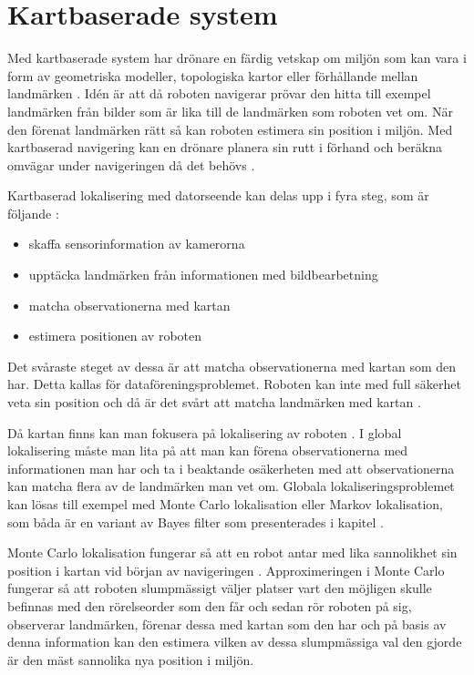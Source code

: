 \section{Kartbaserade system}

Med kartbaserade system har drönare en färdig vetskap om miljön som kan vara i form av geometriska modeller, topologiska kartor eller förhållande mellan landmärken \citep{982903}. Idén är att då roboten navigerar prövar den hitta till exempel landmärken från bilder som är lika till de landmärken som roboten vet om. När den förenat landmärken rätt så kan roboten estimera sin position i miljön. Med kartbaserad navigering kan en drönare planera sin rutt i förhand och beräkna omvägar under navigeringen då det behövs \citep{geospatial}. 

Kartbaserad lokalisering med datorseende kan delas upp i fyra steg, som är följande \citep{982903}:

\begin{itemize}
    \item skaffa sensorinformation av kamerorna
    \item upptäcka landmärken från informationen med bildbearbetning
    \item matcha observationerna med kartan
    \item estimera positionen av roboten
\end{itemize}

Det svåraste steget av dessa är att matcha observationerna med kartan som den har. Detta kallas för dataföreningsproblemet. Roboten kan inte med full säkerhet veta sin position och då är det svårt att matcha landmärken med kartan \citep{982903}.

Då kartan finns kan man fokusera på lokalisering av roboten \citep{982903}. I global lokalisering måste man lita på att man kan förena observationerna med informationen man har och ta i beaktande osäkerheten med att observationerna kan matcha flera av de landmärken man vet om. Globala lokaliseringsproblemet kan lösas till exempel med Monte Carlo lokalisation eller Markov lokalisation, som båda är en variant av Bayes filter som presenterades i kapitel  \citep{ProbabilisticRobotics}. 

Monte Carlo lokalisation fungerar så att en robot antar med lika sannolikhet sin position i kartan vid början av navigeringen \citep{montecarlo}. Approximeringen i Monte Carlo fungerar så att roboten slumpmässigt väljer platser vart den möjligen skulle befinnas med den rörelseorder som den får och sedan rör roboten på sig, observerar landmärken, förenar dessa med kartan som den har och på basis av denna information kan den estimera vilken av dessa slumpmässiga val den gjorde är den mäst sannolika nya position i miljön. 

